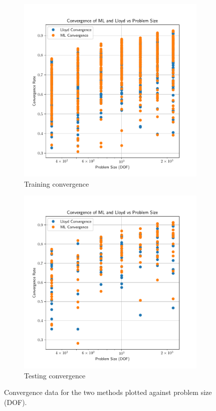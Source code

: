 \documentclass{article}
\begin{document}
\begin{figure}[!htb]
  \centering
  \begin{subfigure}[t]{0.49\textwidth}
    \centering
    \includegraphics[width=\textwidth]{aniso3d_train_convergence_per_size.pdf}
    \caption{Training convergence}
  \end{subfigure}
  \begin{subfigure}[t]{0.49\textwidth}
    \centering
    \includegraphics[width=\textwidth]{aniso3d_test_convergence_per_size.pdf}
    \caption{Testing convergence}
  \end{subfigure}
  \caption{Convergence data for the two methods plotted against problem size (DOF).}
  \label{fig:aniso_conv_per_size}
\end{figure}
\end{document}
